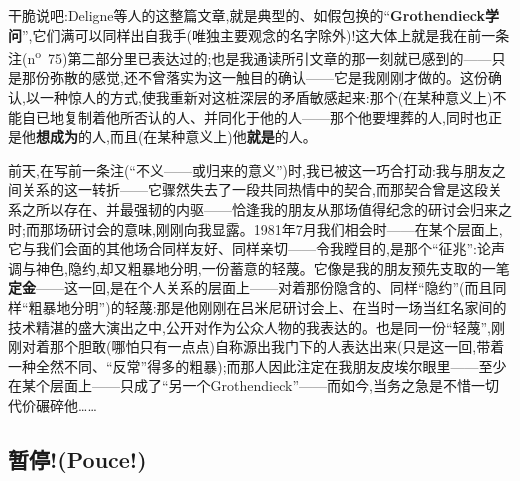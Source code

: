 干脆说吧:Deligne等人的这整篇文章,就是典型的、如假包换的“\textbf{Grothendieck学问}”,它们满可以同样出自我手(唯独主要观念的名字除外)!这大体上就是我在前一条注(n\textsuperscript{o}~75)第二部分里已表达过的;也是我通读所引文章的那一刻就已感到的——只是那份弥散的感觉,还不曾落实为这一触目的确认——它是我刚刚才做的。这份确认,以一种惊人的方式,使我重新对这桩深层的矛盾敏感起来:那个(在某种意义上)不能自已地复制着他所否认的人、并同化于他的人——那个他要埋葬的人,同时\dmark{}也正是他\textbf{想成为}的人,而且(在某种意义上)他\textbf{就是}的人。

前天,在写前一条注(“不义——或归来的意义”)时,我已被这一巧合打动:我与朋友之间关系的这一转折——它骤然失去了一段共同热情中的契合,而那契合曾是这段关系之所以存在、并最强韧的内驱——恰逢我的朋友从那场值得纪念的研讨会归来之时;而那场研讨会的意味,刚刚向我显露。1981年7月我们相会时——在某个层面上,它与我们会面的其他场合同样友好、同样亲切——令我瞠目的,是那个“征兆”:论声调与神色,隐约,却又粗暴地分明,一份蓄意的轻蔑。它像是我的朋友预先支取的一笔\textbf{定金}——这一回,是在个人关系的层面上——对着那份隐含的、同样“隐约”(而且同样“粗暴地分明”)的轻蔑:那是他刚刚在吕米尼研讨会上、在当时一场当红名家间的技术精湛的盛大演出之中,公开对作为公众人物的我表达的。也是同一份“轻蔑”,刚刚对着那个胆敢(哪怕只有一点点)自称源出我门下的人表达出来(只是这一回,带着一种全然不同、“反常”得多的粗暴);而那人因此注定在我朋友皮埃尔眼里——至少在某个层面上——只成了“另一个Grothendieck”——而如今,当务之急是不惜一切代价碾碎他……

\subsection{暂停!(Pouce!)}


